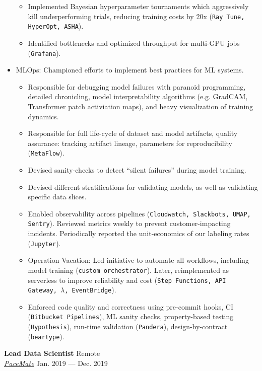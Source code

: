 \documentclass[a4paper,12pt]{article}
\newcommand{\ressubheading}[4]{{\begin{minipage}{\textwidth}
                                    \textbf{#1} \hfill #2 \\
                                    \textit{#3} \hfill #4 \\
\end{minipage}}}
\begin{document}
\begin{itemize}
\begin{itemize}
            \item Implemented Bayesian hyperparameter tournaments which aggressively kill underperforming trials, reducing training costs by 20x (\texttt{Ray Tune, HyperOpt, ASHA}).
            \item Identified bottlenecks and optimized throughput for multi-GPU jobs (\texttt{Grafana}).
        \end{itemize}
        \item MLOps: Championed efforts to implement best practices for ML systems.
        \begin{itemize}
            \item Responsible for debugging model failures with paranoid programming, detailed chronicling, model interpretability algorithms (e.g. GradCAM, Transformer patch activiation maps),  and heavy visualization of training dynamics.
            \item Responsible for full life-cycle of dataset and model artifacts, quality assurance:
            tracking artifact lineage, parameters for reproducibility (\texttt{MetaFlow}).
            \item Devised sanity-checks to detect ``silent failures'' during model training. 
            \item Devised different stratifications for validating models, as well as validating specific data slices. 
            \item Enabled observability across pipelines (\texttt{Cloudwatch, Slackbots, UMAP, Sentry}). Reviewed metrics weekly to prevent customer-impacting incidents. Periodically reported the unit-economics of our labeling rates (\texttt{Jupyter}).
            \item Operation Vacation: Led initiative to automate all workflows, including model training (\texttt{custom orchestrator}). Later, reimplemented as serverless to improve reliability and cost (\texttt{Step Functions, API Gateway, $\lambda$, EventBridge}).
            \item Enforced code quality and correctness using pre-commit hooks, CI (\texttt{Bitbucket Pipelines}), ML sanity checks, property-based testing (\texttt{Hypothesis}), run-time validation (\texttt{Pandera}), design-by-contract (\texttt{beartype}).
        \end{itemize}

    \end{itemize}


    \ressubheading{Lead Data Scientist}{Remote}{\href{https://pacemate.com/}{PaceMate}}{Jan. 2019 --- Dec. 2019}
\end{document}
